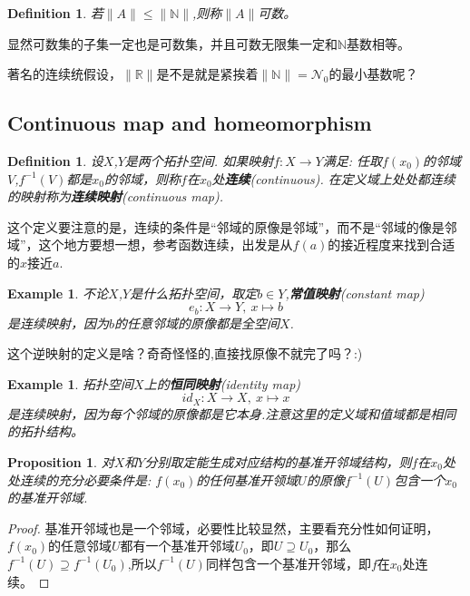 \documentclass{article}
\newtheorem{proposition}[theorem]{Proposition}
\newtheorem{example}[theorem]{Example}
\newtheorem{definition}[theorem]{Definition}
\newcommand*{\xfunc}[4]{{#2}\colon{#3}{#1}{#4}}
\newcommand*{\func}[3]{\xfunc{\to}{#1}{#2}{#3}}
\begin{document}
\begin{definition}
若$\|A\| \leqslant \|\mathbb{N}\|$,则称$\|A\|$可数。 
\end{definition}

显然可数集的子集一定也是可数集，并且可数无限集一定和$\mathbb{N}$基数相等。

著名的连续统假设，$\|\mathbb{R}\|$是不是就是紧挨着$\|\mathbb{N}\|=\mathcal{N}_0$的最小基数呢？
\newpage
\subsection{Continuous map and homeomorphism}

\begin{definition}
设$X$,$Y$是两个拓扑空间. 如果映射$\func{f}{X}{Y}$满足: 任取$f(x_0)$的邻域$V$,$f^{-1}(V)$都是$x_0$的邻域，则称$f$在$x_0$处\textbf{连续}(continuous). 在定义域上处处都连续的映射称为\textbf{连续映射}(continuous map).
\end{definition}

这个定义要注意的是，连续的条件是“邻域的原像是邻域”，而不是“邻域的像是邻域”，这个地方要想一想，参考函数连续，出发是从$f(a)$的接近程度来找到合适的$x$接近$a$.

\begin{example}
不论$X$,$Y$是什么拓扑空间，取定$b \in Y$,\textbf{常值映射}(constant map)\[\func{e_b}{X}{Y},\ x \mapsto b\]是连续映射，因为$b$的任意邻域的原像都是全空间$X$.
\end{example}

这个逆映射的定义是啥？奇奇怪怪的,直接找原像不就完了吗？:)

\begin{example}
拓扑空间$X$上的\textbf{恒同映射}(identity map)\[\func{id_{X}}{X}{X},\ x\mapsto x\]是连续映射，因为每个邻域的原像都是它本身.注意这里的定义域和值域都是相同的拓扑结构。
\end{example}

\begin{proposition}
对$X$和$Y$分别取定能生成对应结构的基准开邻域结构，则$f$在$x_0$处处连续的充分必要条件是: $f(x_0)$的任何基准开领域$U$的原像$f^{-1}(U)$包含一个$x_0$的基准开邻域.
\end{proposition}

\begin{proof}
基准开邻域也是一个邻域，必要性比较显然，主要看充分性如何证明，$f(x_0)$的任意邻域$U$都有一个基准开邻域$U_0$，即$U \supseteq U_0$，那么$f^{-1}(U) \supseteq f^{-1}(U_0)$,所以$f^{-1}(U)$同样包含一个基准开邻域，即$f$在$x_0$处连续。
\end{proof}
\end{document}
